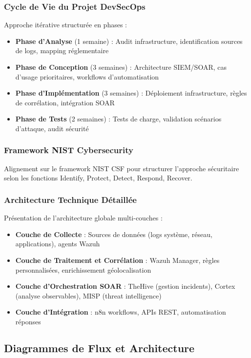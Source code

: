 \subsubsection{Cycle de Vie du Projet DevSecOps}
Approche itérative structurée en phases :
\begin{itemize}
    \item \textbf{Phase d'Analyse} (1 semaine) : Audit infrastructure, identification sources de logs, mapping réglementaire
    \item \textbf{Phase de Conception} (3 semaines) : Architecture SIEM/SOAR, cas d'usage prioritaires, workflows d'automatisation
    \item \textbf{Phase d'Implémentation} (3 semaines) : Déploiement infrastructure, règles de corrélation, intégration SOAR
    \item \textbf{Phase de Tests} (2 semaines) : Tests de charge, validation scénarios d'attaque, audit sécurité
\end{itemize}

\subsubsection{Framework NIST Cybersecurity}
Alignement sur le framework NIST CSF pour structurer l'approche sécuritaire selon les fonctions Identify, Protect, Detect, Respond, Recover.

\subsubsection{Architecture Technique Détaillée}
Présentation de l'architecture globale multi-couches :
\begin{itemize}
    \item \textbf{Couche de Collecte} : Sources de données (logs système, réseau, applications), agents Wazuh
    \item \textbf{Couche de Traitement et Corrélation} : Wazuh Manager, règles personnalisées, enrichissement géolocalisation
    \item \textbf{Couche d'Orchestration SOAR} : TheHive (gestion incidents), Cortex (analyse observables), MISP (threat intelligence)
    \item \textbf{Couche d'Intégration} : n8n workflows, APIs REST, automatisation réponses
\end{itemize}

\subsection{Diagrammes de Flux et Architecture}

